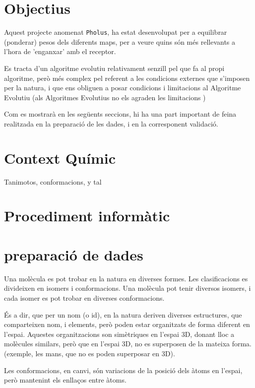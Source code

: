\documentclass[titlepage,a4paper,12pt]{book}
\begin{document}
\section{Objectius} %
\label{sec:Objectius}
Aquest projecte anomenat \texttt{Pholus}, ha estat desenvolupat per a equilibrar (ponderar) pesos dels
diferents maps, per a veure quins són més rellevants a l'hora de 'enganxar' amb el receptor.  %

Es tracta d'un algoritme evolutiu relativament senzill pel que fa al propi algoritme, però més
complex pel referent a les condicions externes que s'imposen per la natura, i que ens obliguen a
posar condicions i limitacions al Algoritme Evolutiu (als Algoritmes Evolutius no els agraden les 
limitacions )

Com es mostrarà en les següents seccions, hi ha una part important de feina
realitzada en la preparació de les dades, i en la corresponent validació.

\section{Context Químic} %
\label{sec:Context Quimic}
Tanimotos, conformacions, y tal 

\section{Procediment informàtic} %
\label{sec:Procediment informatic}


\section{preparació de dades} %
\label{sec:preparacio de dades}
Una molècula es pot trobar en la natura en diverses formes.  Les clasificacions es divideixen en
isomers i conformacions.  Una molècula pot tenir diversos isomers, i cada isomer es pot trobar en  
diverses conformacions.

És a dir, que per un nom (o id), en la natura deriven diverses estructures, que comparteixen nom, i
elements, però poden estar organitzats de forma diferent en l'espai. Aquestes organitzacions son
simètriques en l'espai 3D, donant lloc a molècules similars, però que en l'espai 3D, no es superposen de la
mateixa forma. (exemple, les mans, que no es poden superposar en 3D).

Les conformacions, en canvi, són variacions de la posició dels àtoms en l'espai, però mantenint els
enllaços entre àtoms.
\end{document}

